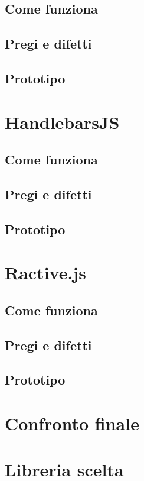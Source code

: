 \subsection{Come funziona}

\subsection{Pregi e difetti}

\subsection{Prototipo}


\FloatBarrier
\section{HandlebarsJS}

\subsection{Come funziona}

\subsection{Pregi e difetti}

\subsection{Prototipo}


\FloatBarrier
\section{Ractive.js}

\subsection{Come funziona}

\subsection{Pregi e difetti}

\subsection{Prototipo}


\clearpage
\section{Confronto finale}

\FloatBarrier
\section{Libreria scelta}


